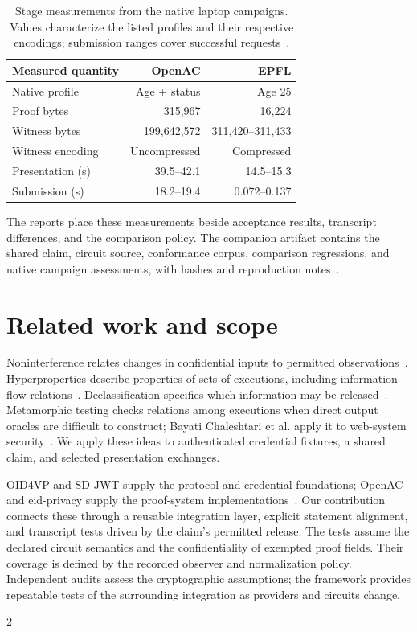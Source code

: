\documentclass[10pt,twocolumn,letterpaper]{article}
\begin{document}
\begin{table}[t]
\centering\small
\setlength{\tabcolsep}{4pt}
\begin{tabular}{@{}lrr@{}}
\toprule
Measured quantity & OpenAC & EPFL\\
\midrule
Native profile & Age + status & Age 25\\
Proof bytes & 315,967 & 16,224\\
Witness bytes & 199,642,572 & 311,420--311,433\\
Witness encoding & Uncompressed & Compressed\\
Presentation (s) & 39.5--42.1 & 14.5--15.3\\
Submission (s) & 18.2--19.4 & 0.072--0.137\\
\bottomrule
\end{tabular}
\caption{Stage measurements from the native laptop campaigns. Values characterize the listed profiles and their respective encodings; submission ranges cover successful requests~\cite{artifact}.}
\label{tab:measurements}
\end{table}

The reports place these measurements beside acceptance results, transcript differences, and the comparison policy. The companion artifact contains the shared claim, circuit source, conformance corpus, comparison regressions, and native campaign assessments, with hashes and reproduction notes~\cite{artifact}.

\section{Related work and scope}
Noninterference relates changes in confidential inputs to permitted observations~\cite{noninterference}. Hyperproperties describe properties of sets of executions, including information-flow relations~\cite{hyperproperties}. Declassification specifies which information may be released~\cite{declassification}. Metamorphic testing checks relations among executions when direct output oracles are difficult to construct; Bayati Chaleshtari et al. apply it to web-system security~\cite{metamorphic}. We apply these ideas to authenticated credential fixtures, a shared claim, and selected presentation exchanges.

OID4VP and SD-JWT supply the protocol and credential foundations; OpenAC and eid-privacy supply the proof-system implementations~\cite{oid4vp,sdjwt,openac,epfl}. Our contribution connects these through a reusable integration layer, explicit statement alignment, and transcript tests driven by the claim's permitted release. The tests assume the declared circuit semantics and the confidentiality of exempted proof fields. Their coverage is defined by the recorded observer and normalization policy. Independent audits assess the cryptographic assumptions; the framework provides repeatable tests of the surrounding integration as providers and circuits change.

\onecolumn
\begin{multicols}{2}


\end{multicols}
\end{document}
